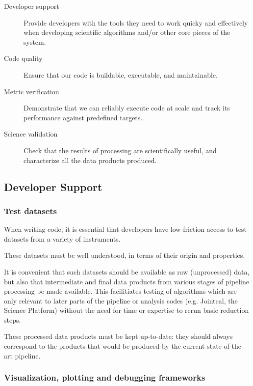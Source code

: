 \documentclass[DM,authoryear,toc,lsstdraft]{lsstdoc}
\begin{document}
\begin{description}

\item[Developer support]{Provide developers with the tools they need to work
quicky and effectively when developing scientific algorithms and/or other core
pieces of the system.}

\item[Code quality]{Ensure that our code is buildable, executable, and
maintainable.}

\item[Metric verification]{Demonstrate that we can reliably execute code at
scale and track its performance against predefined targets.}

\item[Science validation]{Check that the results of processing are
scientifically useful, and characterize all the data products produced.}

\end{description}

\subsection{Developer Support}

\subsubsection{Test datasets}

When writing code, it is essential that developers have low-friction access to
test datasets from a variety of instruments.

These datasets must be well understood, in terms of their origin and
properties.

It is convenient that such datasets should be available as raw (unprocessed)
data, but also that intermediate and final data products from various stages
of pipeline processing be made available. This facilitiates testing of
algorithms which are only relevant to later parts of the pipeline or analysis
codes (e.g. Jointcal, the Science Platform) without the need for time or
expertise to rerun basic reduction steps.

These processed data products must be kept up-to-date: they should always
correspond to the products that would be produced by the current
state-of-the-art pipeline.

\subsubsection{Visualization, plotting and debugging frameworks}
\end{document}
